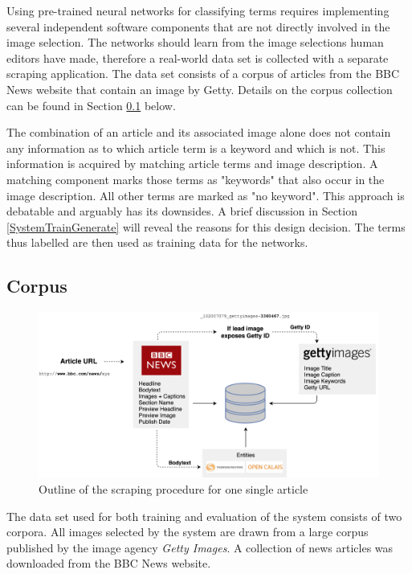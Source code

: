 \documentclass[11pt,a4paper,twoside]{article}
\begin{document}
\bigskip

Using pre-trained neural networks for classifying terms requires implementing several independent software components that are not directly involved in the image selection. The networks should learn from the image selections human editors have made, therefore a real-world data set is collected with a separate scraping application. The data set consists of a corpus of articles from the BBC News website \cite{BBCBBCNews} that contain an image by Getty. Details on the corpus collection can be found in Section \ref{SystemCorpus} below.

The combination of an article and its associated image alone does not contain any information as to which article term is a keyword and which is not. This information is acquired by matching article terms and image description. A matching component marks those terms as "keywords" that also occur in the image description. All other terms are marked as "no keyword". This approach is debatable and arguably has its downsides. A brief discussion in Section \ref{SystemTrainGenerate} will reveal the reasons for this design decision. The terms thus labelled are then used as training data for the networks.

\subsection{Corpus} \label{SystemCorpus}

\begin{figure}[t]
  \includegraphics[width=\columnwidth]{picpic-scraper.png}
  \caption{Outline of the scraping procedure for one single article}
  \label{fig:picpic-scraper}
\end{figure}

The data set used for both training and evaluation of the system consists of two corpora. All images selected by the system are drawn from a large corpus published by the image agency \emph{Getty Images}. A collection of news articles was downloaded from the BBC News website.
\end{document}
